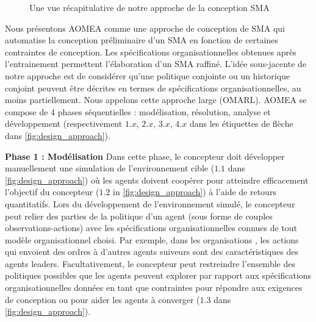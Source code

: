 \documentclass[contribution]{jfsma}
\begin{document}
\begin{figure}[h!]
  \centering
  
  \caption{Une vue récapitulative de notre approche de la conception SMA}
  \label{fig:design_approach}
\end{figure}

Nous présentons AOMEA comme une approche de conception de SMA qui automatise la conception préliminaire d'un SMA en fonction de certaines contraintes de conception. Les spécifications organisationnelles obtenues après l'entrainement permettent l’élaboration d’un SMA raffiné.
L’idée sous-jacente de notre approche est de considérer qu’une politique conjointe ou un historique conjoint peuvent être décrites en termes de spécifications organisationnelles, au moins partiellement.
Nous appelons cette approche large  (OMARL).
%
%
AOMEA se compose de 4 phases séquentielles : modélisation, résolution, analyse et développement (respectivement $1.x$, $2.x$, $3.x$, $4.x$ dans les étiquettes de flèche dans \autoref{fig:design_approach}).

\textbf{Phase 1 : Modélisation} \quad Dans cette phase, le concepteur doit développer manuellement une simulation de l'environnement cible ($1.1$ dans \autoref{fig:design_approach}) où les agents doivent coopérer pour atteindre efficacement l'objectif du concepteur ($1.2 $ in \autoref{fig:design_approach}) à l'aide de retours quantitatifs. Lors du développement de l'environnement simulé, le concepteur peut relier des parties de la politique d'un agent (sous forme de couples observations-actions) avec les spécifications organisationnelles connues de tout modèle organisationnel choisi.
Par exemple, dans les organisations , les actions qui envoient des ordres à d'autres agents suiveurs sont des caractéristiques des agents leaders.
Facultativement, le concepteur peut restreindre l'ensemble des politiques possibles que les agents peuvent explorer par rapport aux spécifications organisationnelles données en tant que contraintes pour répondre aux exigences de conception ou pour aider les agents à converger ($1.3$ dans \autoref{fig:design_approach}).
\end{document}
